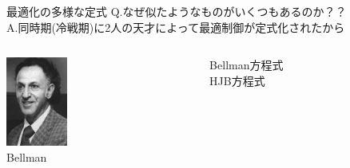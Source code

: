 \documentclass[dvipdfmx,12pt]{beamer}
\begin{document}
    \begin{frame}{最適化の多様な定式}
        \scriptsize
        Q.なぜ似たようなものがいくつもあるのか？？\\

        A.同時期(冷戦期)に2人の天才によって最適制御が定式化されたから\\

        \vspace{5mm}

        \begin{columns}

            \begin{column}{0.5\textwidth}
                \begin{boxnote}
                    \begin{columns}
                        \begin{column}{.5\textwidth}
                            \includegraphics[clip, width = 2.0cm]{Bellman.png}\\
                            {\tiny Bellman}
                            \centering
                        \end{column}
                        \begin{column}{.5\textwidth}
                            Bellman方程式 \\
                            HJB方程式 \\
                        \end{column}
                    \end{columns}
                \end{boxnote}
            \end{column}


\end{columns}
\end{frame}
\end{document}
